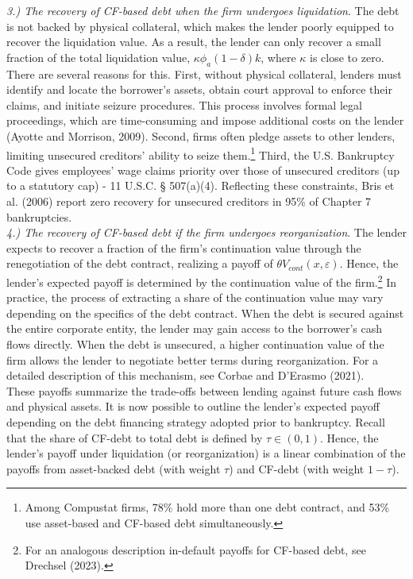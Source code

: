 \documentclass[12pt]{article}
\begin{document}
\textit{ 3.) The recovery of CF-based debt when the firm undergoes liquidation}. The debt is not backed by physical collateral, which makes the lender poorly equipped to recover the liquidation value. As a result, the lender can only recover a small fraction of the total liquidation value, $\kappa \phi_a(1-\delta)k$, where $\kappa$ is close to zero. There are several reasons for this. First, without physical collateral, lenders must identify and locate the borrower's assets, obtain court approval to enforce their claims, and initiate seizure procedures. This process involves formal legal proceedings, which are time-consuming and impose additional costs on the lender (Ayotte and Morrison, 2009). Second, firms often pledge assets to other lenders, limiting unsecured creditors' ability to seize them.\footnote{Among Compustat firms, 78\% hold more than one debt contract, and 53\% use asset-based and CF-based debt simultaneously.} Third, the U.S. Bankruptcy Code gives employees' wage claims priority over those of unsecured creditors (up to a statutory cap) - 11 U.S.C. § 507(a)(4). Reflecting these constraints, Bris et al. (2006) report zero recovery for unsecured creditors in 95\% of Chapter 7 bankruptcies. \vspace{3mm} \\
\textit{ 4.) The recovery of CF-based debt if the firm undergoes reorganization}. The lender expects to recover a fraction of the firm's continuation value through the renegotiation of the debt contract, realizing a payoff of $\theta V_{cont}(x,\varepsilon)$. Hence, the lender's expected payoff is determined by the continuation value of the firm.\footnote{For an analogous description in-default payoffs for CF-based debt, see Drechsel (2023).} In practice, the process of extracting a share of the continuation value may vary depending on the specifics of the debt contract. When the debt is secured against the entire corporate entity, the lender may gain access to the borrower's cash flows directly. When the debt is unsecured, a higher continuation value of the firm allows the lender to negotiate better terms during reorganization. For a detailed description of this mechanism, see Corbae and D'Erasmo (2021). \vspace{3mm} \\
These payoffs summarize the trade-offs between lending against future cash flows and physical assets. It is now possible to outline the lender's expected payoff depending on the debt financing strategy adopted prior to bankruptcy. Recall that the share of CF-debt to total debt is defined by $\tau \in (0,1)$. Hence, the lender's payoff under liquidation (or reorganization) is a linear combination of the payoffs from asset-backed debt (with weight $\tau$) and CF-debt (with weight $1-\tau$).
\end{document}
